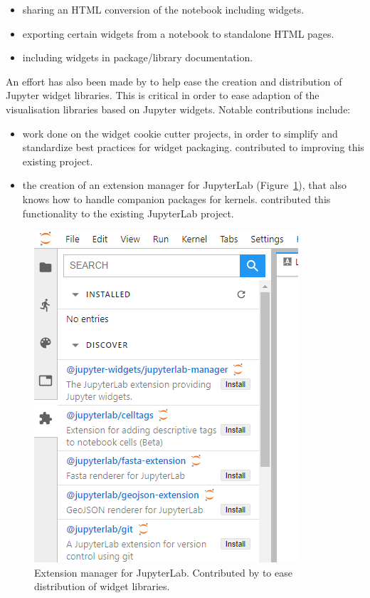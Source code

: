 \documentclass{deliverablereport}
\begin{document}
\begin{itemize}
\item sharing an HTML conversion of the notebook including widgets.
\item exporting certain widgets from a notebook to standalone HTML pages.
\item including widgets in package/library documentation.
\end{itemize}

An effort has also been made by \ODK to help ease the creation and distribution of Jupyter widget libraries. This is critical in order to ease adaption of the visualisation libraries based on Jupyter widgets. Notable contributions include:
\begin{itemize}
\item work done on the widget cookie cutter projects, in order to simplify and standardize best practices for widget packaging. \ODK contributed to improving this existing project.
\item the creation of an extension manager for JupyterLab (Figure~\ref{fig:lab-extmngr}), that also knows how to handle companion packages for kernels. \ODK contributed this functionality to the existing JupyterLab project.
\end{itemize}

\begin{figure}
  \centering
  \includegraphics[scale=0.6]{lab-extmngr.png}
  \caption{Extension manager for JupyterLab. Contributed by \ODK to ease distribution of widget libraries.}
  \label{fig:lab-extmngr}
\end{figure}
\end{document}
